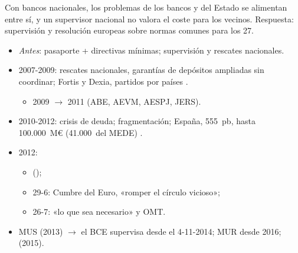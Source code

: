 \documentclass{article}
\begin{document}
\begin{columnas}
\begin{ideaclave}
Con bancos nacionales, los problemas de los bancos y del Estado se alimentan entre sí, y un supervisor nacional no valora el coste para los vecinos. Respuesta: supervisión y resolución europeas sobre normas comunes para los 27.
\end{ideaclave}

\begin{itemize}
\item \emph{Antes}: pasaporte + directivas mínimas; supervisión y rescates nacionales.
\item 2007-2009: rescates nacionales, garantías de depósitos ampliadas sin coordinar; Fortis y Dexia, partidos por países .
  \begin{itemize}
  \item 2009  $\to$ 2011  (ABE, AEVM, AESPJ, JERS).
  \end{itemize}
\item 2010-2012: crisis de deuda; fragmentación; España, 555~pb, hasta 100.000~M€ (41.000~del MEDE) .
\item 2012:
  \begin{itemize}
  \item {} ();
  \item 29-6: Cumbre del Euro, «romper el círculo vicioso»;
  \item 26-7: «lo que sea necesario» y OMT.
  \end{itemize}
\item MUS (2013) $\to$ el BCE supervisa desde el 4-11-2014; MUR desde 2016;  (2015).
\end{itemize}


\end{columnas}
\end{document}
